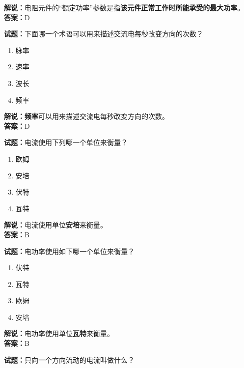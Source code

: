 \documentclass{ctexbook}
\begin{document}
\noindent\textbf{解说：}电阻元件的“额定功率”参数是指\textbf{该元件正常工作时所能承受的最大功率}。\\\noindent\textbf{答案：}D



\bigskip


\noindent\textbf{试题：}下面哪一个术语可以用来描述交流电每秒改变方向的次数？

\begin{enumerate}[leftmargin=3em]
	\item 脉率
	\item 速率
	\item 波长
	\item 频率
\end{enumerate}

\noindent\textbf{解说：}\textbf{频率}可以用来描述交流电每秒改变方向的次数。\cite[137,138]{si}\\
\noindent\textbf{答案：}D



\bigskip


\noindent\textbf{试题：}电流使用下列哪一个单位来衡量？

\begin{enumerate}[leftmargin=3em]
	\item 欧姆
	\item 安培
	\item 伏特
	\item 瓦特
\end{enumerate}

\noindent\textbf{解说：}电流使用单位\textbf{安培}来衡量。\cite[130]{si}\\
\noindent\textbf{答案：}B


\bigskip


\noindent\textbf{试题：}电功率使用如下哪一个单位来衡量？

\begin{enumerate}[leftmargin=3em]
	\item 伏特
	\item 瓦特
	\item 欧姆
	\item 安培
\end{enumerate}

\noindent\textbf{解说：}电功率使用单位\textbf{瓦特}来衡量。\cite[137]{si}\\
\noindent\textbf{答案：}B


\bigskip


\noindent\textbf{试题：}只向一个方向流动的电流叫做什么？
\end{document}
